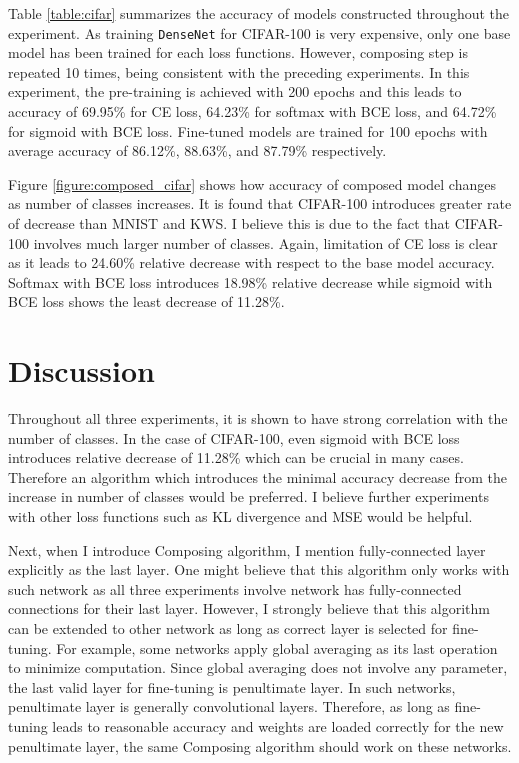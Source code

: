 \documentclass{article}
\begin{document}
Table \ref{table:cifar} summarizes the accuracy of models constructed throughout the experiment. As training \texttt{DenseNet} for CIFAR-100 is very expensive, only one base model has been trained for each loss functions. However, composing step is repeated 10 times, being consistent with the preceding experiments. In this experiment, the pre-training is achieved with 200 epochs and this leads to accuracy of 69.95\% for CE loss, 64.23\% for softmax with BCE loss, and 64.72\% for sigmoid with BCE loss. Fine-tuned models are trained for 100 epochs with average accuracy of 86.12\%, 88.63\%, and 87.79\% respectively.


Figure \ref{figure:composed_cifar} shows how accuracy of composed model changes as number of classes increases. It is found that CIFAR-100 introduces greater rate of decrease than MNIST and KWS. I believe this is due to the fact that CIFAR-100 involves much larger number of classes. Again, limitation of CE loss is clear as it leads to 24.60\% relative decrease with respect to the base model accuracy. Softmax with BCE loss introduces 18.98\% relative decrease while sigmoid with BCE loss shows the least decrease of 11.28\%.

\section{Discussion}

Throughout all three experiments, it is shown to have strong correlation with the number of classes. In the case of CIFAR-100, even sigmoid with BCE loss introduces relative decrease of 11.28\% which can be crucial in many cases. Therefore an algorithm which introduces the minimal accuracy decrease from the increase in number of classes would be preferred. I believe further experiments with other loss functions such as KL divergence and MSE would be helpful.

Next, when I introduce Composing algorithm, I mention fully-connected layer explicitly as the last layer. One might believe that this algorithm only works with such network as all three experiments involve network has fully-connected connections for their last layer. However, I strongly believe that this algorithm can be extended to other network as long as correct layer is selected for fine-tuning. For example, some networks apply global averaging as its last operation to minimize computation. Since global averaging does not involve any parameter, the last valid layer for fine-tuning is penultimate layer. In such networks, penultimate layer is generally convolutional layers. Therefore, as long as fine-tuning leads to reasonable accuracy and weights are loaded correctly for the new penultimate layer, the same Composing algorithm should work on these networks.
\end{document}
